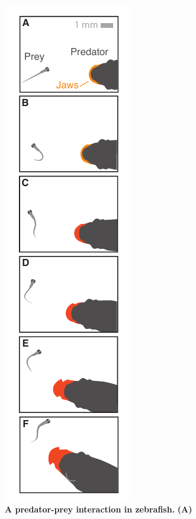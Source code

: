 \documentclass[12pt]{article}
\begin{document}
\pagebreak
\begin{figure}	
\includegraphics[width=.35\textwidth]{Fig_01.pdf}
\centering	
\caption{\textbf{A predator-prey interaction in zebrafish.} \textbf{(A)}  }
\label{pred_prey}
\end{figure}

\end{document}

